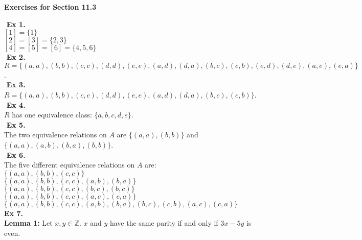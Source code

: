 \documentclass{article}
\date{}
\author{}
\begin{document}
\centerline{\textbf{Exercises for Section 11.3}}
$ $\newline
\textbf{Ex 1.}\\
$[1]=\{1\}$\\
$[2]=[3]=\{2,3\}$\\
$[4]=[5]=[6]=\{4,5,6\}$\\
$ $\newline
\textbf{Ex 2.}\\
$R = \{(a,a),(b,b),(c,c),(d,d),(e,e),(a,d),(d,a),(b,c),(c,b),(e,d),(d,e),(a,e),(e,a)\}$.\\
$ $\newline
\textbf{Ex 3.}\\
$R=\{(a,a),(b,b),(c,c),(d,d),(e,e),(a,d),(d,a),(b,c),(c,b)\}$.\\
$ $\newline
\textbf{Ex 4.}\\
$R$ has one equivalence class: $\{a,b,c,d,e\}$.\\
$ $\newline
\textbf{Ex 5.}\\
The two equivalence relations on $A$ are $\{(a,a),(b,b)\}$ and $\{(a,a),(a,b),(b,a),(b,b)\}$.\\
$ $\newline
\textbf{Ex 6.}\\
The five different equivalence relations on $A$ are:\\
$\{(a,a),(b,b),(c,c)\}$\\
$\{(a,a),(b,b),(c,c),(a,b),(b,a)\}$\\
$\{(a,a),(b,b),(c,c),(b,c),(b,c)\}$\\
$\{(a,a),(b,b),(c,c),(a,c),(c,a)\}$\\
$\{(a,a),(b,b),(c,c),(a,b),(b,a),(b,c),(c, b),(a,c),(c,a)\}$\\
\newpage
\noindent\textbf{Ex 7.}\\
\textbf{Lemma 1:} Let $x, y \in \mathbb{Z}$. $x$ and $y$ have the same parity if and only if $3x - 5y$ is even.
\end{document}
